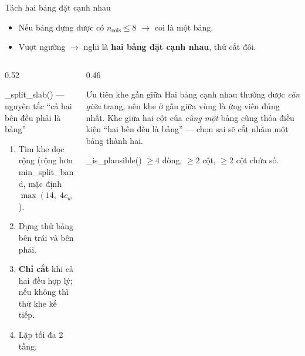 \documentclass[aspectratio=169,11pt]{beamer}
\newcommand{\src}[1]{{\footnotesize\ttfamily #1}}
\begin{document}
\begin{frame}{Tách hai bảng đặt cạnh nhau}
  \begin{itemize}\small
    \item Nếu bảng dựng được có $n_{\text{cols}} \le 8$ $\rightarrow$ coi là một bảng.
    \item Vượt ngưỡng $\rightarrow$ nghi là \textbf{hai bảng đặt cạnh nhau}, thử cắt đôi.
  \end{itemize}
  \begin{columns}[T]
    \begin{column}{0.52\textwidth}
      \begin{block}{\small \src{\_split\_slab()} — nguyên tắc ``cả hai bên đều phải là bảng''}
        \begin{enumerate}\footnotesize
          \item Tìm khe dọc rộng (rộng hơn \src{min\_split\_band}, mặc định $\max(14,\;4c_w)$).
          \item Dựng thử bảng bên trái và bên phải.
          \item \textbf{Chỉ cắt} khi cả hai đều hợp lý; nếu không thì thử khe kế tiếp.
          \item Lặp tối đa 2 tầng.
        \end{enumerate}
      \end{block}
    \end{column}
    \begin{column}{0.46\textwidth}
      \begin{alertblock}{\small Ưu tiên khe gần giữa}
        Hai bảng cạnh nhau thường được \emph{căn giữa} trang, nên khe ở gần giữa
        vùng là ứng viên đúng nhất. Khe giữa hai cột của \emph{cùng một} bảng cũng
        thỏa điều kiện ``hai bên đều là bảng'' — chọn sai sẽ cắt nhầm một bảng
        thành hai.
      \end{alertblock}
      \begin{block}{\small \src{\_is\_plausible()}}
        $\ge 4$ dòng, $\ge 2$ cột, $\ge 2$ cột chứa số.
      \end{block}
    \end{column}
  \end{columns}
\end{frame}
\end{document}
